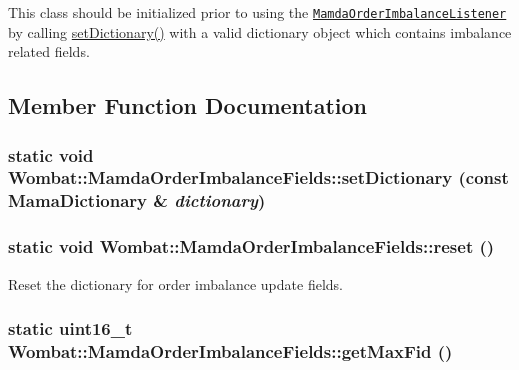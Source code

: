 This class should be initialized prior to using the {\tt \hyperlink{classWombat_1_1MamdaOrderImbalanceListener}{Mamda\-Order\-Imbalance\-Listener}} by calling \hyperlink{classWombat_1_1MamdaOrderImbalanceFields_e63c54bfcd113c93e66a29bae959770f}{set\-Dictionary()} with a valid dictionary object which contains imbalance related fields. 



\subsection{Member Function Documentation}
\hypertarget{classWombat_1_1MamdaOrderImbalanceFields_e63c54bfcd113c93e66a29bae959770f}{
\subsubsection[setDictionary]{\setlength{\rightskip}{0pt plus 5cm}static void Wombat::Mamda\-Order\-Imbalance\-Fields::set\-Dictionary (const Mama\-Dictionary \& {\em dictionary})}}
\label{classWombat_1_1MamdaOrderImbalanceFields_e63c54bfcd113c93e66a29bae959770f}


\hypertarget{classWombat_1_1MamdaOrderImbalanceFields_a263d2dfa02fe1ca2bd754d93c2d9acf}{
\subsubsection[reset]{\setlength{\rightskip}{0pt plus 5cm}static void Wombat::Mamda\-Order\-Imbalance\-Fields::reset ()}}
\label{classWombat_1_1MamdaOrderImbalanceFields_a263d2dfa02fe1ca2bd754d93c2d9acf}


Reset the dictionary for order imbalance update fields. 

\hypertarget{classWombat_1_1MamdaOrderImbalanceFields_50ed8628a53dd7d4694cc3d99b505901}{
\subsubsection[getMaxFid]{\setlength{\rightskip}{0pt plus 5cm}static uint16\_\-t Wombat::Mamda\-Order\-Imbalance\-Fields::get\-Max\-Fid ()}}
\label{classWombat_1_1MamdaOrderImbalanceFields_50ed8628a53dd7d4694cc3d99b505901}


